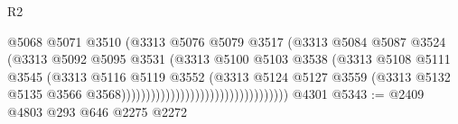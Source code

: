 \begin{lexlean}{R2}
\begin{coremodule}
                                                        @5068
                                                        @5071
                                                        @3510
                                                        (@3313
                                                          @5076
                                                          @5079
                                                          @3517
                                                          (@3313
                                                            @5084
                                                            @5087
                                                            @3524
                                                            (@3313
                                                              @5092
                                                              @5095
                                                              @3531
                                                              (@3313
                                                                @5100
                                                                @5103
                                                                @3538
                                                                (@3313
                                                                  @5108
                                                                  @5111
                                                                  @3545
                                                                  (@3313
                                                                    @5116
                                                                    @5119
                                                                    @3552
                                                                    (@3313
                                                                      @5124
                                                                      @5127
                                                                      @3559
                                                                      (@3313
                                                                        @5132
                                                                        @5135
                                                                        @3566
                                                                        @3568))))))))))))))))))))))))))))))))))
    @4301
@5343 := @2409 @4803 @293 @646 @2275 @2272

\end{coremodule}
\end{lexlean}
